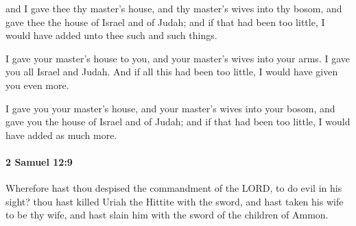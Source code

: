 			\begin{versebox}
					\item[BHS] 
					\item[ASV] and I gave thee thy master's house, and thy master's wives into thy bosom, and gave thee the house of Israel and of Judah; and if that had been too little, I would have added unto thee such and such things.
					\item[NIV] I gave your master’s house to you, and your master’s wives into your arms. I gave you all Israel and Judah. And if all this had been too little, I would have given you even more.
					\item[NRSV] I gave you your master’s house, and your master’s wives into your bosom, and gave you the house of Israel and of Judah; and if that had been too little, I would have added as much more.
			\end{versebox}

		\paragraph{2 Samuel 12:9} %
			\label{2SAMUEL-12-9}

			Wherefore hast thou despised the commandment of the LORD, to do evil in his sight? thou hast killed Uriah the Hittite with the sword, and hast taken his wife to be thy wife, and hast slain him with the sword of the children of Ammon.

